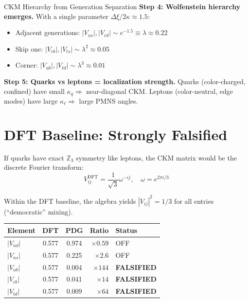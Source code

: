 \begin{mechanism}{CKM Hierarchy from Generation Separation}
\textbf{Step 4: Wolfenstein hierarchy emerges.}
With a single parameter $\Delta\xi/2\kappa \approx 1.5$:
\begin{itemize}[nosep]
    \item Adjacent generations: $|V_{us}|, |V_{cd}| \sim e^{-1.5} \equiv \lambda \approx 0.22$
    \item Skip one: $|V_{cb}|, |V_{ts}| \sim \lambda^2 \approx 0.05$
    \item Corner: $|V_{ub}|, |V_{td}| \sim \lambda^3 \approx 0.01$
\end{itemize}

\textbf{Step 5: Quarks vs leptons = localization strength.}
Quarks (color-charged, confined) have small $\kappa_q \Rightarrow$ near-diagonal CKM.
Leptons (color-neutral, edge modes) have large $\kappa_\ell \Rightarrow$ large PMNS angles.
\end{mechanism}

\section{DFT Baseline: Strongly Falsified}
\label{sec:dft_baseline}

If quarks have exact $\mathbb{Z}_3$ symmetry like leptons, the CKM matrix would
be the discrete Fourier transform:
\begin{equation}
    V_{ij}^{\text{DFT}} = \frac{1}{\sqrt{3}} \omega^{-ij}, \quad \omega = e^{2\pi i/3}
\end{equation}

Within the DFT baseline, the algebra \tagDerSym{} yields $|V_{ij}|^2 = 1/3$
for all entries (``democratic'' mixing).

\begin{center}
\begin{tabular}{lccrl}
\toprule
\textbf{Element} & \textbf{DFT} & \textbf{PDG} \tagBL{} & \textbf{Ratio} & \textbf{Status} \\
\midrule
$|V_{ud}|$ & 0.577 & 0.974 & $\times 0.59$ & OFF \\
$|V_{us}|$ & 0.577 & 0.225 & $\times 2.6$ & OFF \\
$|V_{ub}|$ & 0.577 & 0.004 & $\times 144$ & \textbf{FALSIFIED} \\
$|V_{cb}|$ & 0.577 & 0.041 & $\times 14$ & \textbf{FALSIFIED} \\
$|V_{td}|$ & 0.577 & 0.009 & $\times 64$ & \textbf{FALSIFIED} \\
\bottomrule
\end{tabular}
\end{center}

